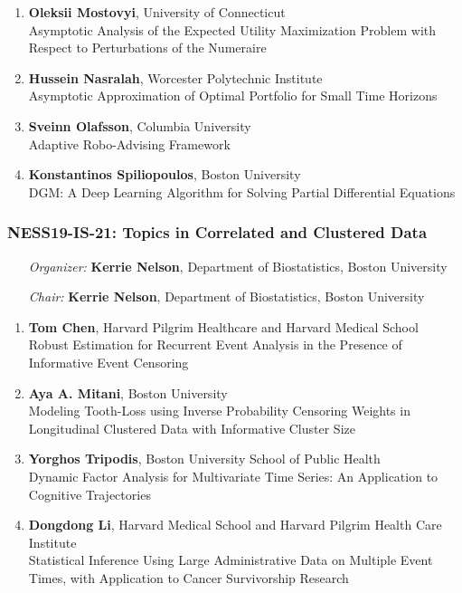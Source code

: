 \begin{enumerate}
\item \textbf{Oleksii Mostovyi}, University of Connecticut \\
Asymptotic Analysis of the Expected Utility Maximization Problem with Respect to Perturbations of the Numeraire
\item \textbf{Hussein Nasralah}, Worcester Polytechnic Institute \\
Asymptotic Approximation of Optimal Portfolio for Small Time Horizons
\item \textbf{Sveinn Olafsson}, Columbia University \\
Adaptive Robo-Advising Framework
\item \textbf{Konstantinos Spiliopoulos}, Boston University \\
DGM: A Deep Learning Algorithm for Solving Partial Differential Equations
\end{enumerate}

\subsubsection*{NESS19-IS-21: Topics in Correlated and Clustered Data}

\begin{enumerate}[align=left]
\item [\emph{Organizer:}] \textbf{Kerrie Nelson}, Department of Biostatistics, Boston University
\item [\emph{Chair:}] \textbf{Kerrie Nelson}, Department of Biostatistics, Boston University
\end{enumerate}

\begin{enumerate}
\item \textbf{Tom Chen}, Harvard Pilgrim Healthcare and Harvard Medical School \\
Robust Estimation for Recurrent Event Analysis in the Presence of Informative Event Censoring
\item \textbf{Aya A. Mitani}, Boston University \\
Modeling Tooth-Loss using Inverse Probability Censoring Weights in Longitudinal Clustered Data with Informative Cluster Size
\item \textbf{Yorghos Tripodis}, Boston University School of Public Health \\
Dynamic Factor Analysis for Multivariate Time Series: An Application to Cognitive Trajectories
\item \textbf{Dongdong Li}, Harvard Medical School and Harvard Pilgrim Health Care Institute \\
Statistical Inference Using Large Administrative Data on Multiple Event Times, with Application to Cancer Survivorship Research
\end{enumerate}

